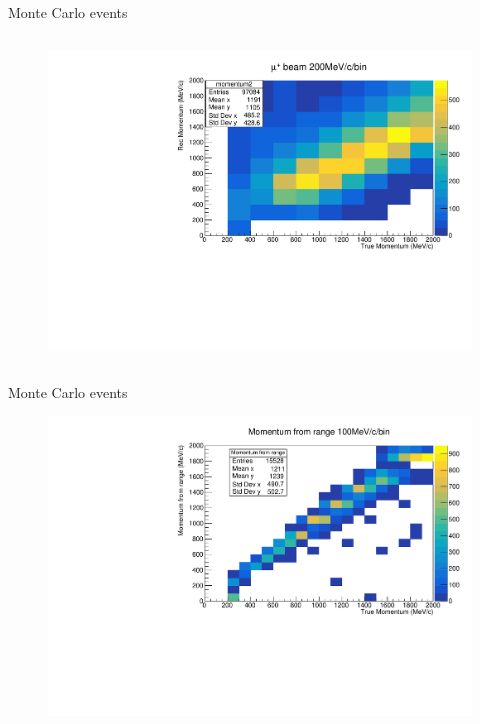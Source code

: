 \documentclass[11pt]{beamer}
\begin{document}
\begin{frame}{Monte Carlo events}
\begin{columns}[T]
\begin{column}{.48\textwidth}
\begin{figure}[h!]
				\includegraphics[width=\textwidth]{MomentumAntiMuonBeamZoom.pdf}
		\end{figure}
	\end{column}%
\end{columns}

\end{frame}

\begin{frame}{Monte Carlo events}
		\begin{figure}[h!]
	\centering
	\includegraphics[width=\textwidth]{MomentumRangeMuonBeam.pdf}
\end{figure}
\end{frame}
\end{document}
